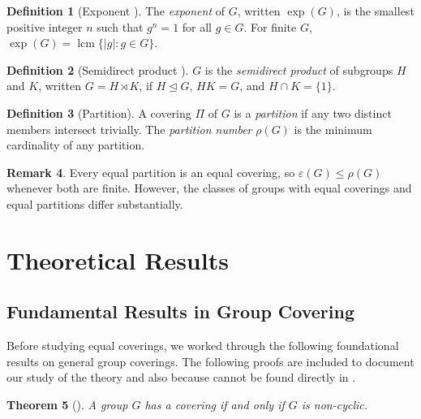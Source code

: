 \documentclass[12pt, a4paper]{article}
\theoremstyle{plain}
\newtheorem{theorem}{Theorem}[section]
\theoremstyle{definition}
\newtheorem{definition}[theorem]{Definition}
\newtheorem{remark}[theorem]{Remark}
\DeclareMathOperator{\Exp}{exp}
\DeclareMathOperator{\lcm}{lcm}
\newcommand{\eps}{\varepsilon}
\newcommand{\norml}{\trianglelefteq}
\begin{document}
\begin{definition}[Exponent {\cite[Definition~4]{velasquez2022}}]
  The \emph{exponent} of $G$, written $\Exp(G)$, is the smallest positive integer $n$
  such that $g^n = 1$ for all $g \in G$. For finite $G$, $\Exp(G) = \lcm\{|g| : g \in G\}$.
\end{definition}

\begin{definition}[Semidirect product {\cite[Definition~5]{velasquez2022}}]
  $G$ is the \emph{semidirect product} of subgroups $H$ and $K$, written $G = H \rtimes K$,
  if $H \norml G$, $HK = G$, and $H \cap K = \{1\}$.
\end{definition}

\begin{definition}[Partition]
  A covering $\Pi$ of $G$ is a \emph{partition} if any two distinct members intersect
  trivially. The \emph{partition number} $\rho(G)$ is the minimum cardinality of any
  partition.
\end{definition}

\begin{remark}
  Every equal partition is an equal covering, so $\eps(G) \leq \rho(G)$ whenever both are
  finite. However, the classes of groups with equal coverings and equal partitions differ
  substantially.
\end{remark}


\section{Theoretical Results}
\label{sec:theory}

\subsection{Fundamental Results in Group Covering}
Before studying equal coverings, we worked through the following foundational results on general group coverings. The following proofs are included to document our study of the theory and also because cannot be found directly in \cite{velasquez2022}.


\begin{theorem}[{\cite[Theorem~1]{velasquez2022}}]
  \label{thm:cyclic}
  A group $G$ has a covering if and only if $G$ is non-cyclic.
\end{theorem}
\end{document}

